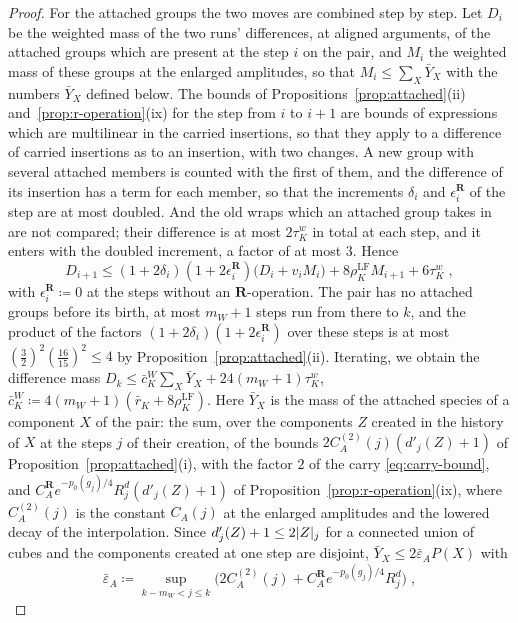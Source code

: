 \documentclass[11pt]{preprint}
\DeclarePairedDelimiter{\abs}{\lvert}{\rvert}
\numberwithin{equation}{section}
\theoremstyle{definition}
\theoremstyle{remark}
\theoremstyle{plain}
\begin{document}
\begin{proof}
For the attached groups the two moves are combined step by step. Let $D_i$ be the weighted mass of the two runs' differences, at aligned arguments, of the attached groups which are present at the step $i$ on the pair, and $M_i$ the weighted mass of these groups at the enlarged amplitudes, so that $M_i \leq \sum_X\bar Y_X$ with the numbers $\bar Y_X$ defined below. The bounds of Propositions~\ref{prop:attached}(ii) and~\ref{prop:r-operation}(ix) for the step from $i$ to $i + 1$ are bounds of expressions which are multilinear in the carried insertions, so that they apply to a difference of carried insertions as to an insertion, with two changes. A new group with several attached members is counted with the first of them, and the difference of its insertion has a term for each member, so that the increments $\delta_i$ and $\epsilon^{\mathbf R}_i$ of the step are at most doubled. And the old wraps which an attached group takes in are not compared; their difference is at most $2\tau^w_K$ in total at each step, and it enters with the doubled increment, a factor of at most $3$. Hence
\[
    D_{i+1} \leq (1 + 2\delta_i)(1 + 2\epsilon^{\mathbf R}_i)\bigl(D_i + v_iM_i\bigr) + 8\rho^{\mathrm{LF}}_KM_{i+1} + 6\tau^w_K\;,
\]
with $\epsilon^{\mathbf R}_i \coloneqq 0$ at the steps without an $\mathbf R$-operation. The pair has no attached groups before its birth, at most $m_W + 1$ steps run from there to $k$, and the product of the factors $(1 + 2\delta_i)(1 + 2\epsilon^{\mathbf R}_i)$ over these steps is at most $(\frac32)^2(\frac{16}{15})^2 \leq 4$ by Proposition~\ref{prop:attached}(ii). Iterating, we obtain the difference mass $D_k \leq \bar c^W_K\sum_X\bar Y_X + 24(m_W + 1)\tau^w_K$, $\bar c^W_K \coloneqq 4(m_W + 1)(\bar r_K + 8\rho^{\mathrm{LF}}_K)$. Here $\bar Y_X$ is the mass of the attached species of a component $X$ of the pair: the sum, over the components $Z$ created in the history of $X$ at the steps $j$ of their creation, of the bounds $2C^{(2)}_A(j)(d'_j(Z) + 1)$ of Proposition~\ref{prop:attached}(i), with the factor $2$ of the carry \eqref{eq:carry-bound}, and $C^{\mathbf R}_Ae^{-p_0(g_j)/4}R_j^d(d'_j(Z) + 1)$ of Proposition~\ref{prop:r-operation}(ix), where $C^{(2)}_A(j)$ is the constant $C_A(j)$ at the enlarged amplitudes and the lowered decay of the interpolation. Since $d'_j(Z) + 1 \leq 2\abs Z_j$ for a connected union of cubes and the components created at one step are disjoint, $\bar Y_X \leq 2\bar\varepsilon_AP(X)$ with
\[
    \bar\varepsilon_A \coloneqq \sup_{k - m_W < j \leq k}\bigl(2C^{(2)}_A(j) + C^{\mathbf R}_Ae^{-p_0(g_j)/4}R_j^d\bigr)\;,
\]

\end{proof}
\end{document}
